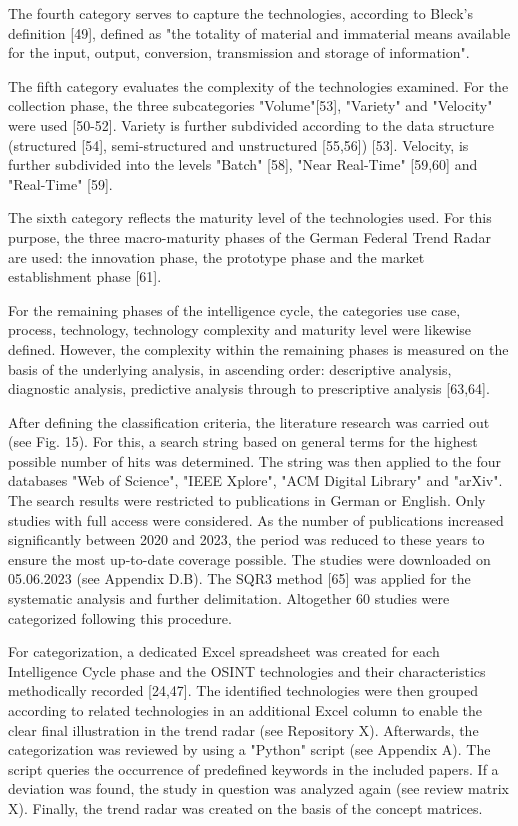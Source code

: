 \documentclass[10pt]{article}
\begin{document}
The fourth category serves to capture the technologies, according to
Bleck's definition [49], defined as "the totality of material and
immaterial means available for the input, output, conversion,
transmission and storage of information".

The fifth category evaluates the complexity of the technologies
examined. For the collection phase, the three subcategories
"Volume"[53], "Variety" and "Velocity" were used [50-52]. Variety
is further subdivided according to the data structure (structured 
[54], semi-structured and unstructured [55,56]) [53]. Velocity,
is further subdivided into the levels "Batch" [58], "Near Real-Time"
[59,60] and "Real-Time" [59].

The sixth category reflects the maturity level of the technologies used.
For this purpose, the three macro-maturity phases of the German Federal
Trend Radar are used: the innovation phase, the prototype phase and
the market establishment phase [61].

For the remaining phases of the intelligence cycle, the categories use
case, process, technology, technology complexity and maturity level
were likewise defined. However, the complexity within the remaining
phases is measured on the basis of the underlying analysis, in
ascending order: descriptive analysis, diagnostic analysis, predictive
analysis through to prescriptive analysis [63,64].

After defining the classification criteria, the literature research
was carried out (see Fig. 15). For this, a search string based on
general terms for the highest possible number of hits was determined.
The string was then applied to the four databases "Web of Science",
"IEEE Xplore", "ACM Digital Library" and "arXiv". The search results
were restricted to publications in German or English. Only studies
with full access were considered. As the number of publications
increased significantly between 2020 and 2023, the period was reduced
to these years to ensure the most up-to-date coverage possible.
The studies were downloaded on 05.06.2023 (see Appendix D.B). The
SQR3 method [65] was applied for the systematic analysis and further
delimitation. Altogether 60 studies were categorized following this
procedure.

For categorization, a dedicated Excel spreadsheet was created for each
Intelligence Cycle phase and the OSINT technologies and their
characteristics methodically recorded [24,47]. The identified
technologies were then grouped according to related technologies in an
additional Excel column to enable the clear final illustration in the
trend radar (see Repository X). Afterwards, the categorization was
reviewed by using a "Python" script (see Appendix A). The script
queries the occurrence of predefined keywords in the included papers.
If a deviation was found, the study in question was analyzed again
(see review matrix X). Finally, the trend radar was created on the
basis of the concept matrices.
\end{document}
